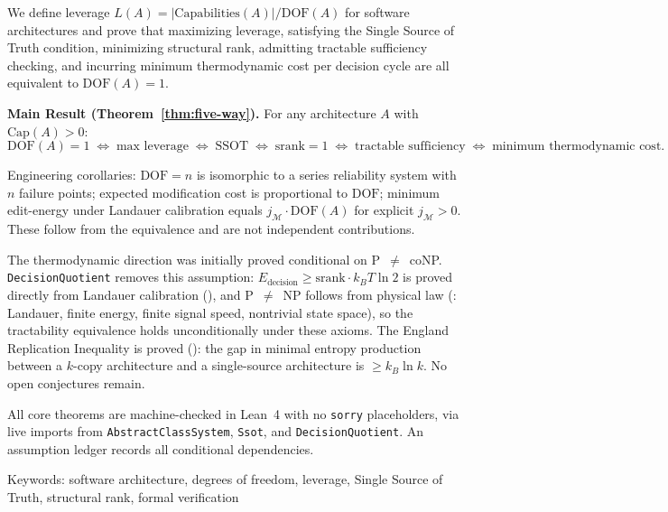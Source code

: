 We define leverage $L(A) = |\mathrm{Capabilities}(A)| / \mathrm{DOF}(A)$ for software architectures and prove that maximizing leverage, satisfying the Single Source of Truth condition, minimizing structural rank, admitting tractable sufficiency checking, and incurring minimum thermodynamic cost per decision cycle are all equivalent to $\mathrm{DOF}(A) = 1$.

\textbf{Main Result (Theorem~\ref{thm:five-way}).} For any architecture $A$ with $\mathrm{Cap}(A) > 0$:
\[
\mathrm{DOF}(A) = 1
\;\iff\; \text{max leverage}
\;\iff\; \text{SSOT}
\;\iff\; \mathrm{srank} = 1
\;\iff\; \text{tractable sufficiency}
\;\iff\; \text{minimum thermodynamic cost}.
\]

Engineering corollaries: $\mathrm{DOF} = n$ is isomorphic to a series reliability system with $n$ failure points; expected modification cost is proportional to $\mathrm{DOF}$; minimum edit-energy under Landauer calibration equals $j_{\mathcal{M}} \cdot \mathrm{DOF}(A)$ for explicit $j_{\mathcal{M}} > 0$. These follow from the equivalence and are not independent contributions.

The thermodynamic direction was initially proved conditional on P~$\neq$~coNP. \texttt{DecisionQuotient} removes this assumption: $E_{\mathrm{decision}} \geq \mathrm{srank} \cdot k_B T \ln 2$ is proved directly from Landauer calibration (), and P~$\neq$~NP follows from physical law (: Landauer, finite energy, finite signal speed, nontrivial state space), so the tractability equivalence holds unconditionally under these axioms. The England Replication Inequality is proved (): the gap in minimal entropy production between a $k$-copy architecture and a single-source architecture is $\geq k_B \ln k$. No open conjectures remain.

All core theorems are machine-checked in Lean~4 with no \texttt{sorry} placeholders, via live imports from \texttt{AbstractClassSystem}, \texttt{Ssot}, and \texttt{DecisionQuotient}. An assumption ledger records all conditional dependencies.

Keywords: software architecture, degrees of freedom, leverage, Single Source of Truth, structural rank, formal verification
